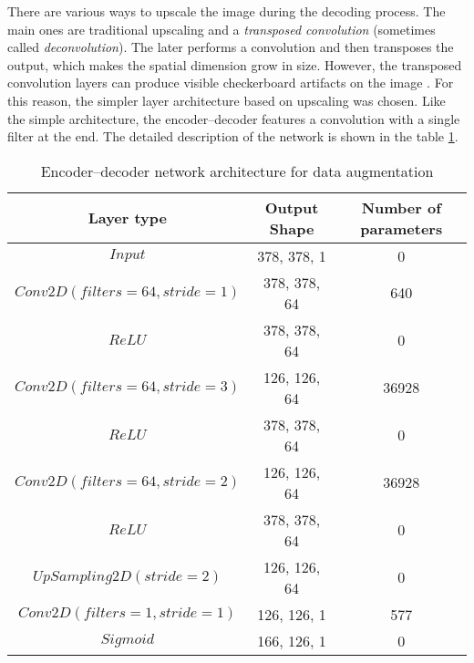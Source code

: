 There are various ways to upscale the image during the decoding process.
The main ones are traditional upscaling and a \textit{transposed convolution} (sometimes called \textit{deconvolution}).
The later performs a convolution and then transposes the output, which makes the spatial dimension grow in size.
However, the transposed convolution layers can produce visible checkerboard artifacts on the image \cite{odena-2016-deconvolution}.
For this reason, the simpler layer architecture based on upscaling was chosen.
Like the simple architecture, the encoder--decoder features a convolution with a single filter at the end.
The detailed description of the network is shown in the table \ref{tab:autoencoder-arch}.
\begin{table}
    \centering
    \caption{Encoder--decoder network architecture for data augmentation}
    \label{tab:autoencoder-arch}
    \begin{tabular}{ccc}
        \toprule
        Layer type & Output Shape & Number of parameters \\
        \midrule
        $ Input $      & 378, 378, 1  & 0                    \\
        $ Conv2D(filters=64, stride=1) $ & 378, 378, 64 & 640 \\
        $ ReLU $ & 378, 378, 64 & 0 \\
        $ Conv2D(filters=64, stride=3) $ & 126, 126, 64 & 36928 \\
        $ ReLU $ & 378, 378, 64 & 0 \\
        $ Conv2D(filters=64, stride=2) $ & 126, 126, 64 & 36928 \\
        $ ReLU $ & 378, 378, 64 & 0 \\
        $ UpSampling2D(stride=2) $ & 126, 126, 64 & 0 \\
        $ Conv2D(filters=1, stride=1) $ & 126, 126, 1 & 577 \\
        $ Sigmoid $ & 166, 126, 1 & 0 \\
        \bottomrule
    \end{tabular}
\end{table}

